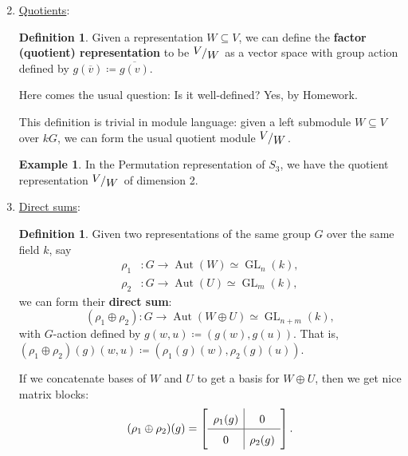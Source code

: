 \documentclass[12pt]{article}
\newcommand{\quotient}[2]{{\makebox[\width-2.3pt][l]{\raisebox{.2em}{$#1$}}\left/\raisebox{-.2em}{$#2$}\right.}}
\theoremstyle{definition}
\newtheorem{definition}[theorem]{Definition}
\newtheorem{example}{Example}[section]
\DeclareMathOperator\Aut{Aut}
\DeclareMathOperator\GL{GL}
\begin{document}
\begin{enumerate}
    \setcounter{enumi}{1}
    \item \underline{Quotients}:
    \begin{definition}
        Given a representation $W\subseteq V$, we can define the \textbf{factor (quotient) representation} to be $\quotient{V}{W}$ as a vector space with group action defined by $g(\overline{v})\coloneqq \overline{g(v)}$.
    \end{definition}
    Here comes the usual question: Is it well-defined? Yes, by Homework.

    This definition is trivial in module language: given a left submodule $W\subseteq V$ over $kG$, we can form the usual quotient module $\quotient{V}{W}$.
    \begin{example}
        In the Permutation representation of $S_3$, we have the quotient representation $\quotient{V}{W}$ of dimension 2. 
    \end{example}
    \item \underline{Direct sums}:
    \begin{definition}
        Given two representations of the same group $G$ over the same field $k$, say 
        \begin{equation}
            \begin{split}
                \rho_1&:G\to\Aut(W)\simeq\GL_n(k),\\
                \rho_2&:G\to\Aut(U)\simeq\GL_m(k),
            \end{split}
        \end{equation}
        we can form their \textbf{direct sum}:
        \begin{equation}
            (\rho_1\oplus\rho_2):G\to\Aut(W\oplus U)\simeq \GL_{n+m}(k),
        \end{equation}
        with $G$-action defined by $g(w,u)\coloneqq (g(w),g(u))$. That is, $(\rho_1\oplus\rho_2)(g)(w,u)\coloneqq \left(\rho_1(g)(w),\rho_2(g)(u)\right)$.
    \end{definition}
    If we concatenate bases of $W$ and $U$ to get a basis for $W \oplus U$, then we get nice matrix blocks:
    \begin{equation}
        (\rho_1\oplus\rho_2)(g)=
        \left[\def
        \arraystretch{1.5}\begin{array}{c | c}
            \rho_1(g) & 0  \\
            \hline 
            0 & \rho_2(g)  
        \end{array}\right].
    \end{equation}

\end{enumerate}
\end{document}
